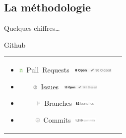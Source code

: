 \CedricSpeak{}
\subsection{La méthodologie}
\begin{frame}{Quelques chiffres\ldots}
	\begin{block}{Github}
		\begin{tabular}{cc}
			\hspace{-20px}
			\begin{minipage}{0.62\textwidth}
				\footnotesize
				\begin{itemize}
					\item \includegraphics[height=8px]{images/labels/pullRequestGreen.JPG}~Pull~Requests~
								\includegraphics[height=8px]{images/stats/pullrequest.png}
					\item \includegraphics[height=8px]{images/labels/issues.JPG}~Issues~
								\includegraphics[height=8px]{images/stats/issues.png}
				\end{itemize}
			\end{minipage}
			\hspace{-15px}
			\begin{minipage}{0.5\textwidth}
				\footnotesize
				\begin{itemize}
					\item \includegraphics[height=10px]{images/labels/branches.JPG}~Branches~\includegraphics[height=10px]{images/stats/branches.png}
					\item \includegraphics[height=10px]{images/labels/commits.JPG}~Commits~\includegraphics[height=10px]{images/stats/commits.png}

\end{itemize}
\end{minipage}
\end{tabular}
\end{block}
\end{frame}
